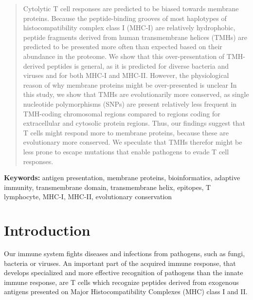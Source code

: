 \begin{abstract}

Cytolytic T cell responses are predicted to be biased towards membrane proteins. 
Because the peptide-binding grooves of most haplotypes 
of histocompatibility complex class I (MHC-I) are relatively hydrophobic, 
peptide fragments derived from human transmembrane helices (TMHs) 
are predicted to be presented more often than expected
based on their abundance in the proteome.
We show that this over-presentation of TMH-derived peptides is  general, 
as it is predicted for diverse bacteria and viruses 
and for both MHC-I and MHC-II.  However, the physiological reason of why membrane proteins might be 
over-presented is unclear
In this study, we show that TMHs are evolutionarily more conserved, 
as single nucleotide polymorphisms (SNPs) 
are present relatively less frequent in TMH-coding chromosomal regions 
compared to regions coding for extracellular and cytosolic protein regions. 
Thus, our findings suggest that T cells might respond 
more to membrane proteins, because these are evolutionary more conserved.
We speculate that TMHs therefor might be less prone to escape mutations 
that enable pathogens to evade T cell responses.

\end{abstract}

{\bf Keywords:} antigen presentation, membrane proteins, bioinformatics, 
adaptive immunity, transmembrane domain, transmembrane helix, 
epitopes, T lymphocyte, MHC-I, MHC-II, evolutionary conservation

\section{Introduction}


Our immune system fights diseases and infections from pathogens, 
such as fungi, bacteria or viruses. 
An important part of the acquired immune response, 
that develops specialized and more effective recognition of pathogens than the innate immune response, 
are T cells which recognize peptides derived from 
exogenous antigens presented on Major Histocompatibility Complexes (MHC) class I and II. 

